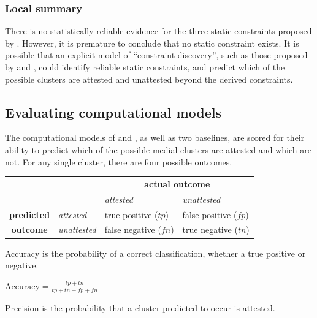 \subsubsection{Local summary}

There is no statistically reliable evidence for the three static constraints proposed by \citeauthor{Pierrehumbert1994}. However, it is premature to conclude that no static constraint exists. It is possible that an explicit model of ``constraint discovery'', such as those proposed by \citet{Pierrehumbert1994} and \citet{Hayes2008a}, could identify reliable static constraints, and predict which of the possible clusters are attested and unattested beyond the derived constraints. 

\subsection{Evaluating computational models}

The computational models of \citeauthor{Pierrehumbert1994} and \citeauthor{Hayes2008a}, as well as two baselines, are scored for their ability to predict which of the possible medial clusters are attested and which are not. For any single cluster, there are four possible outcomes.

\begin{example}
\begin{tabular}{c l | l l}
                   & & \multicolumn{2}{c}{\textbf{actual outcome}}            \\
                   & & \emph{attested}   & \emph{unattested}            \\
\midrule
\textbf{predicted} & \emph{attested}   & true positive ($tp$)  & false positive ($fp$) \\
\textbf{outcome}   & \emph{unattested} & false negative ($fn$) & true negative ($tn$)  \\
\end{tabular}
\end{example}

\noindent Accuracy is the probability of a correct classification, whether a true positive or negative.

\begin{unlabeledexample}
$\displaystyle \textrm{Accuracy} = \frac{tp + tn}{tp + tn + fp + fn}$
\end{unlabeledexample}

\noindent Precision is the probability that a cluster predicted to occur is attested.

